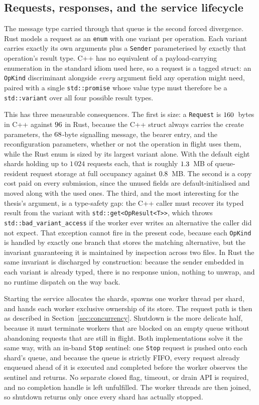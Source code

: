 \documentclass[english,twoside,openright,a4paper,censored,csm,software-track-2020]{HYthesisML}
\begin{document}
\subsection{Requests, responses, and the service lifecycle}\label{sec:tagged}
\label{sec:request}
The message type carried through that queue is the second forced divergence. Rust models a
request as an \texttt{enum} with one variant per
operation. Each variant carries exactly its own arguments plus a \texttt{Sender} parameterised
by exactly that operation's result type. C++ has no equivalent of a payload-carrying
enumeration in the standard idiom used here, so a request is a tagged struct: an
\texttt{OpKind} discriminant alongside \emph{every} argument field any operation might need,
paired with a single \texttt{std::promise} whose value type must therefore be a
\texttt{std::variant} over all four possible result types.

This has three measurable consequences. The first is size: a \texttt{Request} is $160$~bytes
in C++ against $96$ in Rust, because the C++ struct always carries the create parameters, the
$68$-byte signalling message, the bearer entry, and the reconfiguration parameters, whether or
not the operation in flight uses them, while the Rust enum is sized by its largest variant
alone. With the default eight shards holding up to $1\,024$ requests each, that is roughly $1.3$~MB of
queue-resident request storage at full occupancy against $0.8$~MB. The second is a copy cost
paid on every submission, since the unused fields are default-initialised and moved along with
the used ones. The third, and the most interesting for the thesis's argument, is a type-safety
gap: the C++ caller must recover its typed result from the variant with
\texttt{std::get<OpResult<T>>}, which throws \texttt{std::bad\_variant\_access} if the worker
ever writes an alternative the caller did not expect. That exception cannot fire in the
present code, because each \texttt{OpKind} is handled by exactly one branch that stores the
matching alternative, but the invariant guaranteeing it is maintained by inspection across two
files. In Rust the same invariant is discharged by construction: because the sender embedded
in each variant is already typed, there is no response union, nothing to unwrap, and no
runtime dispatch on the way back.

Starting the service allocates the shards, spawns one worker thread per shard, and hands each
worker exclusive ownership of its store. The request path is then as described in
Section~\ref{sec:concurrency}. Shutdown is the more delicate half, because it must terminate
workers that are blocked on an empty queue without abandoning requests that are still in
flight. Both implementations solve it the same way, with an in-band \texttt{Stop} sentinel:
one \texttt{Stop} request is pushed onto each shard's queue, and because the queue is strictly
FIFO, every request already enqueued ahead of it is executed and completed before the worker
observes the sentinel and returns. No separate closed flag, timeout, or drain API is required,
and no completion handle is left unfulfilled. The worker threads are then joined, so shutdown
returns only once every shard has actually stopped.
\end{document}
